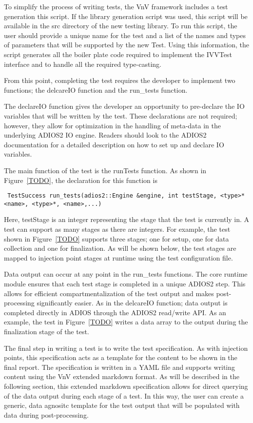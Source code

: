 To simplify the process of writing tests, the VnV framework includes a test generation this script. If the library generation script was used, this script will be available in the src directory of the new testing library. To run this script, the user should provide a unique name for the test and a list of the names and types of parameters that will be supported by the new Test. Using this information, the script generates all the boiler plate code required to implement the IVVTest interface and to handle all the required type-casting. 

From this point, completing the test requires the developer to implement two functions; the delcareIO function and the run_tests function. 

The declareIO function gives the developer an opportunity to pre-declare the IO variables that will be written by the test. These declarations are not required; however, they allow for optimization in the handling of meta-data in the underlying ADIOS2 IO engine. Readers should look to the ADIOS2 documentation for a detailed description on how to set up and declare IO variables. 

The main function of the test is the runTests function. As shown in Figure~\ref{TODO}, the declaration for this function is

\begin{verbatim}
 TestSuccess run_tests(adios2::Engine &engine, int testStage, <type>* <name>, <type>*, <name>,...)
\end{verbatim}

Here, testStage is an integer representing the stage that the test is currently in. A test can support as many stages as there are integers. For example, 
the test shown in Figure~\ref{TODO} supports three stages; one for setup, one for data collection and one for finalization. As will be shown below, the test 
stages are mapped to injection point stages at runtime using the test configuration file. 

Data output can occur at any point in the run_tests functions. The core runtime module ensures that each test stage is completed in a unique ADIOS2 step. This allows for efficient 
compartmentalization of the test output and makes post-processing significantly easier. As in the delcareIO function; data output is completed directly in ADIOS through the 
ADIOS2 read/write API. As an example, the test in Figure~\ref{TODO} writes a data array to the output during the finalization stage of the test. 

The final step in writing a test is to write the test specification. As with injection points, this specification acts as a template for the 
content to be shown in the final report. The specification is written in a YAML file and supports writing content using the VnV extended markdown format. As will be described 
in the following section, this extended markdown specification allows for direct querying of the data output during each stage of a \VV test. In this way, the user can 
create a generic, data agnositc template for the \VV test output that will be populated with data during post-processing. 

